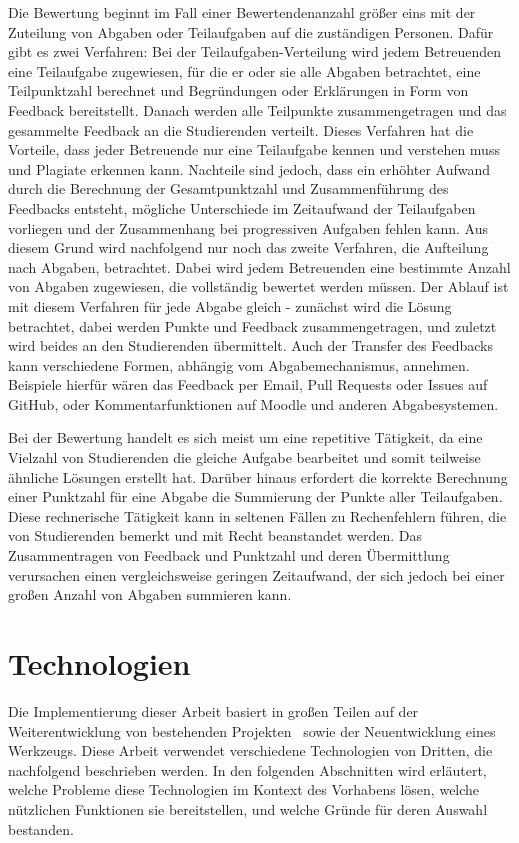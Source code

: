Die Bewertung beginnt im Fall einer Bewertendenanzahl größer eins mit der Zuteilung von Abgaben oder Teilaufgaben auf die zuständigen Personen.
Dafür gibt es zwei Verfahren:
Bei der Teilaufgaben-Verteilung wird jedem Betreuenden eine Teilaufgabe zugewiesen, für die er oder sie alle Abgaben betrachtet, eine Teilpunktzahl berechnet und Begründungen oder Erklärungen in Form von Feedback bereitstellt.
Danach werden alle Teilpunkte zusammengetragen und das gesammelte Feedback an die Studierenden verteilt.
Dieses Verfahren hat die Vorteile, dass jeder Betreuende nur eine Teilaufgabe kennen und verstehen muss und Plagiate erkennen kann.
Nachteile sind jedoch, dass ein erhöhter Aufwand durch die Berechnung der Gesamtpunktzahl und Zusammenführung des Feedbacks entsteht, mögliche Unterschiede im Zeitaufwand der Teilaufgaben vorliegen und der Zusammenhang bei progressiven Aufgaben fehlen kann.
Aus diesem Grund wird nachfolgend nur noch das zweite Verfahren, die Aufteilung nach Abgaben, betrachtet.
Dabei wird jedem Betreuenden eine bestimmte Anzahl von Abgaben zugewiesen, die vollständig bewertet werden müssen.
Der Ablauf ist mit diesem Verfahren für jede Abgabe gleich - zunächst wird die Lösung betrachtet, dabei werden Punkte und Feedback zusammengetragen, und zuletzt wird beides an den Studierenden übermittelt.
Auch der Transfer des Feedbacks kann verschiedene Formen, abhängig vom Abgabemechanismus, annehmen.
Beispiele hierfür wären das Feedback per Email, Pull Requests oder Issues auf GitHub, oder Kommentarfunktionen auf Moodle und anderen Abgabesystemen.

Bei der Bewertung handelt es sich meist um eine repetitive Tätigkeit, da eine Vielzahl von Studierenden die gleiche Aufgabe bearbeitet und somit teilweise ähnliche Lösungen erstellt hat.
Darüber hinaus erfordert die korrekte Berechnung einer Punktzahl für eine Abgabe die Summierung der Punkte aller Teilaufgaben.
Diese rechnerische Tätigkeit kann in seltenen Fällen zu Rechenfehlern führen, die von Studierenden bemerkt und mit Recht beanstandet werden.
Das Zusammentragen von Feedback und Punktzahl und deren Übermittlung verursachen einen vergleichsweise geringen Zeitaufwand, der sich jedoch bei einer großen Anzahl von Abgaben summieren kann.

\section{Technologien}\label{sec:tech}

Die Implementierung dieser Arbeit basiert in großen Teilen auf der Weiterentwicklung von bestehenden Projekten~\cite{bachelor-thesis} sowie der Neuentwicklung eines Werkzeugs.
Diese Arbeit verwendet verschiedene Technologien von Dritten, die nachfolgend beschrieben werden.
In den folgenden Abschnitten wird erläutert, welche Probleme diese Technologien im Kontext des Vorhabens lösen, welche nützlichen Funktionen sie bereitstellen, und welche Gründe für deren Auswahl bestanden.

